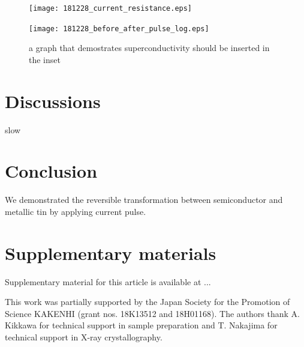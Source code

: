 \documentclass[aip,apl,reprint]{revtex4-1}
\begin{document}
\begin{figure}[!h]
    \begin{center}
   \texttt{[image: 181228\_current\_resistance.eps]}
  \end{center}
  \caption{}
  \label{fig:181228_current_resistance.eps}
\end{figure}

\begin{figure}[!h]
    \begin{center}
   \texttt{[image: 181228\_before\_after\_pulse\_log.eps]}
  \end{center}
  \caption{a graph that demostrates superconductivity should be inserted in the inset }
  \label{fig:181228_before_after_pulse_log}
\end{figure}

\section{Discussions}
slow\cite{oike}

\section{Conclusion}
We demonstrated the reversible transformation between semiconductor and metallic tin by applying current pulse.

\section{Supplementary materials}
Supplementary material for this article is available at ...

\begin{acknowledgments}
This work was partially supported by the Japan Society for the Promotion of Science KAKENHI (grant nos. 18K13512 and 18H01168).
The authors thank A. Kikkawa for technical support in sample preparation and T. Nakajima for technical support in X-ray crystallography.
\end{acknowledgments}


\end{document}
